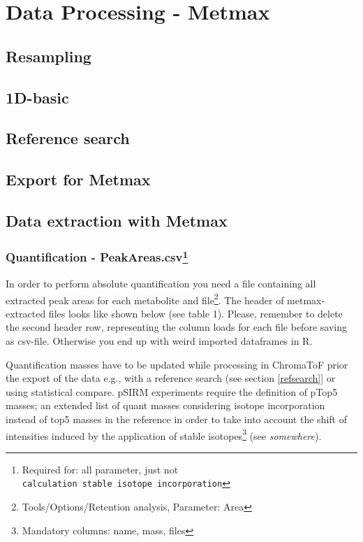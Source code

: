 \documentclass[]{book}
\let\rmarkdownfootnote\footnote%
\def\footnote{\protect\rmarkdownfootnote}
\theoremstyle{definition}
\theoremstyle{definition}
\theoremstyle{definition}
\theoremstyle{remark}
\begin{document}
\chapter{Data Processing - Metmax}\label{metmaxproc}

\section{Resampling}\label{resampling}

\section{1D-basic}\label{d-basic}

\section{Reference search}\label{reference-search}

\section{Export for Metmax}\label{export-for-metmax}

\section{Data extraction with Metmax}\label{metmax-dataextr}

\subsection[Quantification -
PeakAreas.csv]{\texorpdfstring{Quantification - PeakAreas.csv\footnote{Required
  for: all parameter, just not
  \texttt{calculation\ stable\ isotope\ incorporation}}}{Quantification - PeakAreas.csv}}\label{quantification---peakareas.csv}

In order to perform absolute quantification you need a file containing
all extracted peak areas for each metabolite and file\footnote{Tools/Options/Retention
  analysis, Parameter: Area}. The header of metmax-extracted files looks
like shown below (see table 1). Please, remember to delete the second
header row, representing the column loads for each file before saving as
csv-file. Otherwise you end up with weird imported dataframes in R.

Quantification masses have to be updated while processing in ChromaToF
prior the export of the data e.g., with a reference search (see section
\ref{refsearch}{]} or using statistical compare. pSIRM experiments
require the definition of pTop5 masses; an extended list of quant masses
considering isotope incorporation instead of top5 masses in the
reference in order to take into account the shift of intensities induced
by the application of stable isotopes\footnote{Mandatory columns: name,
  mass, files} (see \emph{somewhere}).
\end{document}
